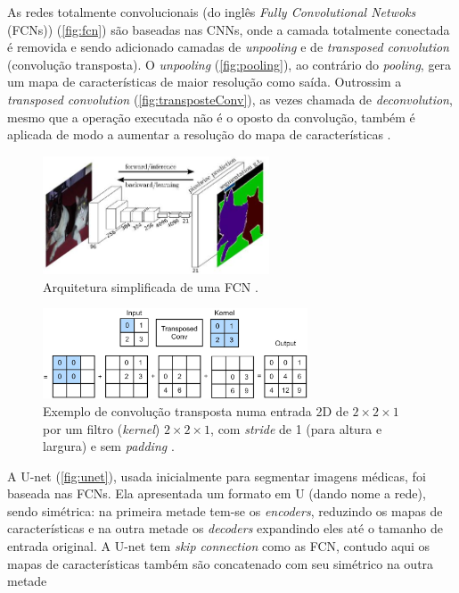 \documentclass[12pt, a4paper, english, brazil]{article}
\begin{document}
As redes totalmente convolucionais (do inglês \textit{Fully Convolutional Netwoks} (FCNs)) (\autoref{fig:fcn}) são baseadas nas CNNs, onde a camada totalmente conectada é removida e sendo adicionado camadas de \textit{unpooling} e de \textit{transposed convolution} (convolução transposta).
O \textit{unpooling} (\autoref{fig:pooling}), ao contrário do \textit{pooling}, gera um mapa de características de maior resolução como saída. Outrossim a \textit{transposed convolution} (\autoref{fig:transposteConv}), as vezes chamada de \textit{deconvolution}, mesmo que a operação executada não é o oposto da convolução, também é aplicada de modo a aumentar a resolução do mapa de características \cite{Long_2015, Fang_2017}. 
\begin{figure}[htbp]
    \centering
    \includegraphics[width=0.6\textwidth]{img/fcn.jpg}
    \caption{Arquitetura simplificada de uma FCN \cite{Long_2015}.}
    \label{fig:fcn}
\end{figure}

\begin{figure}[htbp]
    \centering
    \includegraphics[width=0.7\textwidth]{img/trans_conv.jpg}
    \caption{Exemplo de convolução transposta numa entrada 2D de $2\times2\times1$ por um filtro (\textit{kernel}) $2\times2\times1$, com \textit{stride} de 1 (para altura e largura) e sem \textit{padding} \cite{Zhang_2021}.}
    \label{fig:transposteConv}
\end{figure}

A U-net (\autoref{fig:unet}), usada inicialmente para segmentar imagens médicas, foi baseada nas FCNs. Ela apresentada um formato em U (dando nome a rede), sendo simétrica: na primeira metade tem-se os \textit{encoders}, reduzindo os mapas de características e na outra metade os \textit{decoders} expandindo eles até o tamanho de entrada original. A U-net tem \textit{skip connection} como as FCN, contudo aqui os mapas de características também são concatenado com seu simétrico na outra metade \cite{Ronneberge_2015, Hao_2020}
\end{document}
